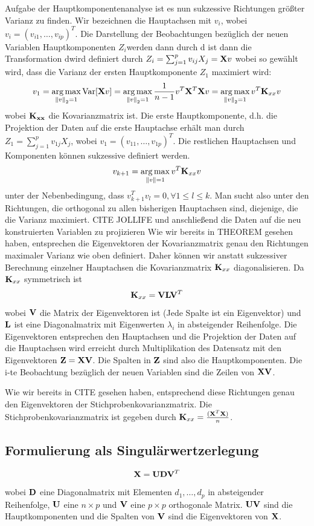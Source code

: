 Aufgabe der Hauptkomponentenanalyse ist es nun sukzessive Richtungen größter Varianz zu finden. Wir bezeichnen die Hauptachsen mit $v_i$, wobei $v_i = (v_{i1}, \ldots, v_{ip})^T$. Die Darstellung der Beobachtungen bezüglich der neuen Variablen Hauptkomponenten $Z_i $werden dann durch d ist dann die Transformation dwird definiert durch $Z_i = \sum_{j=1}^p v_{ij}X_j = \mathbf{X}v$ wobei  so gewählt wird, dass die Varianz der ersten Hauptkomponente $Z_1$ maximiert wird:
$$v_1 = \operatorname*{arg\,max}_{\left\lVert v \right\rVert_2 = 1} \text{Var}[\mathbf{X}v] = \operatorname*{arg\,max}_{\left\lVert v \right\rVert_2 = 1} \frac{1}{n-1} v^T\mathbf{X}^T\mathbf{X}v  = \operatorname*{arg\,max}_{\left\lVert v \right\rVert_2 = 1} v^T \mathbf{K}_{xx} v$$
wobei $\mathbf{K_{xx}}$ die Kovarianzmatrix ist. Die erste Hauptkomponente, d.h. die Projektion der Daten auf die erste Hauptachse erhält man durch $Z_1 = \sum_{j=1}^{p} v_{1j}X_j$, wobei $v_1 = (v_{11}, \ldots, v_{1p})^T$. Die restlichen Hauptachsen und Komponenten können sukzessive definiert werden.
$$v_{k+1} = \operatorname*{arg\,max}_{\left\lVert v \right\rVert = 1} v^T \mathbf{K}_{xx} v$$ unter der Nebenbedingung, dass $v_{k+1}^Tv_l = 0, \forall 1 \leq l \leq k$. Man sucht also unter den Richtungen, die orthogonal zu allen bisherigen Hauptachsen sind, diejenige, die die Varianz maximiert.
\cite{zou_overview}
CITE JOLLIFE
und anschließend die Daten auf die neu konstruierten Variablen zu projizieren
Wie wir bereits in THEOREM gesehen haben, entsprechen die Eigenvektoren der Kovarianzmatrix genau den Richtungen maximaler Varianz wie oben definiert. Daher können wir anstatt sukzessiver Berechnung einzelner Hauptachsen die Kovarianzmatrix $\mathbf{K}_{xx}$ diagonalisieren. Da $\mathbf{K}_{xx}$ symmetrisch ist
$$\mathbf{K}_{xx} = \mathbf{V} \mathbf{L} \mathbf{V}^T$$
wobei $\mathbf{V}$ die Matrix der Eigenvektoren ist (Jede Spalte ist ein Eigenvektor) und $\mathbf{L}$ ist eine Diagonalmatrix mit Eigenwerten $\lambda_i$ in absteigender Reihenfolge. Die Eigenvektoren entsprechen den Hauptachsen und die Projektion der Daten auf die Hauptachsen wird erreicht durch Multiplikation des Datensatz mit den Eigenvektoren $\mathbf{Z} = \mathbf{X} \mathbf{V}$. Die Spalten in $\mathbf{Z}$ sind also die Hauptkomponenten. Die i-te Beobachtung bezüglich der neuen Variablen sind die Zeilen von $\mathbf{X}\mathbf{V}$.



 Wie wir bereits in CITE gesehen haben, entsprechend diese Richtungen genau den Eigenvektoren der Stichprobenkovarianzmatrix. Die Stichprobenkovarianzmatrix ist gegeben durch $\mathbf{K}_{xx} = \frac{(\mathbf{X}^T\mathbf{X})}{n}$. 
 


\subsection{Formulierung als Singulärwertzerlegung}
$$ \mathbf{X} = \mathbf{U}\mathbf{D}\mathbf{V}^T $$
wobei $\mathbf{D}$ eine Diagonalmatrix mit Elementen $d_1,\ldots,d_p$ in absteigender Reihenfolge, $\mathbf{U}$ eine $n \times p$ und $\mathbf{V}$ eine $p \times p$ orthogonale Matrix.
$\mathbf{U}\mathbf{V}$ sind die Hauptkomponenten und die Spalten von $\mathbf{V}$ sind die Eigenvektoren von $\mathbf{X}$.

